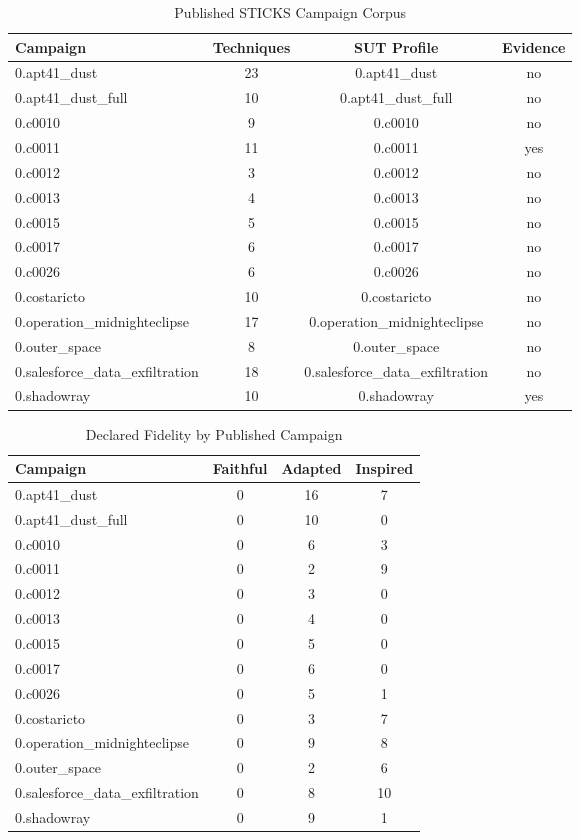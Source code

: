 
\begin{table}[htbp]
\centering
\caption{Published STICKS Campaign Corpus}
\label{tab:corpus}
\begin{tabular}{lccc}
\toprule
Campaign & Techniques & SUT Profile & Evidence \\
\midrule
0.apt41_dust & 23 & 0.apt41_dust & no \\
0.apt41_dust_full & 10 & 0.apt41_dust_full & no \\
0.c0010 & 9 & 0.c0010 & no \\
0.c0011 & 11 & 0.c0011 & yes \\
0.c0012 & 3 & 0.c0012 & no \\
0.c0013 & 4 & 0.c0013 & no \\
0.c0015 & 5 & 0.c0015 & no \\
0.c0017 & 6 & 0.c0017 & no \\
0.c0026 & 6 & 0.c0026 & no \\
0.costaricto & 10 & 0.costaricto & no \\
0.operation_midnighteclipse & 17 & 0.operation_midnighteclipse & no \\
0.outer_space & 8 & 0.outer_space & no \\
0.salesforce_data_exfiltration & 18 & 0.salesforce_data_exfiltration & no \\
0.shadowray & 10 & 0.shadowray & yes \\
\bottomrule
\end{tabular}
\end{table}


\begin{table}[htbp]
\centering
\caption{Declared Fidelity by Published Campaign}
\label{tab:fidelity}
\begin{tabular}{lccc}
\toprule
Campaign & Faithful & Adapted & Inspired \\
\midrule
0.apt41_dust & 0 & 16 & 7 \\
0.apt41_dust_full & 0 & 10 & 0 \\
0.c0010 & 0 & 6 & 3 \\
0.c0011 & 0 & 2 & 9 \\
0.c0012 & 0 & 3 & 0 \\
0.c0013 & 0 & 4 & 0 \\
0.c0015 & 0 & 5 & 0 \\
0.c0017 & 0 & 6 & 0 \\
0.c0026 & 0 & 5 & 1 \\
0.costaricto & 0 & 3 & 7 \\
0.operation_midnighteclipse & 0 & 9 & 8 \\
0.outer_space & 0 & 2 & 6 \\
0.salesforce_data_exfiltration & 0 & 8 & 10 \\
0.shadowray & 0 & 9 & 1 \\
\bottomrule
\end{tabular}
\end{table}


